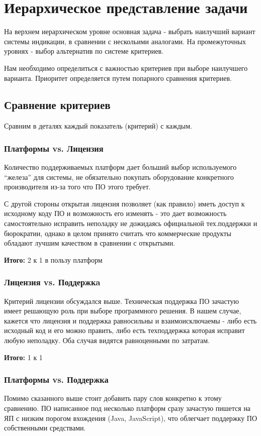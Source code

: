 \documentclass[a4paper,12pt]{report} %
\begin{document}
\section{Иерархическое представление задачи}
На верхнем иерархическом уровне основная задача - выбрать наилучший вариант
системы индикации, в сравнении с нескольими аналогами. На промежуточных уровнях
- выбор альтернатив по системе критериев.

Нам необходимо определиться с важностью критериев при выборе наилучшего
варианта. Приоритет определяется путем попарного сравнения критериев.
\subsection{Сравнение критериев}
Сравним в деталях каждый показатель (критерий) с каждым.
\subsubsection{Платформы vs. Лицензия}
Количество поддерживаемых платформ дает больший выбор используемого ``железа''
для системы, не обязательно покупать оборудование конкретного производителя
из-за того что ПО этого требует.

С другой стороны открытая лицензия позволяет (как правило) иметь доступ к
исходному коду ПО и возможность его изменять - это дает возможность
самостоятельно исправить неполадку не дожидаясь официальной тех.поддержки и
бюрократии, однако в целом принято считать что коммерческие продукты обладают
лучшим качеством в сравнении с открытыми.

\textbf{Итого:} 2 к 1 в пользу платформ
\subsubsection{Лицензия vs. Поддержкa}
Критерий лицензии обсуждался выше. Техническая поддержка ПО зачастую имеет
решающую роль при выборе программного решения. В нашем случае, кажется что
лицензия и поддержка равносильны и взаимоисключаемы - либо есть исходный код и
его можно править, либо есть техподдержка которая исправит любую неполадку. Оба
случая видятся равноценными по затратам.

\textbf{Итого:} 1 к 1
\subsubsection{Платформы vs. Поддержка}
Помимо сказанного выше стоит добавить пару слов конкретно к этому сравнению. ПО
написанное под несколько платформ сразу зачастую пишется на ЯП с низким порогом
вхождения (Java, JavaScript), что облегчает поддержку ПО собственными
средствами.
\end{document}
